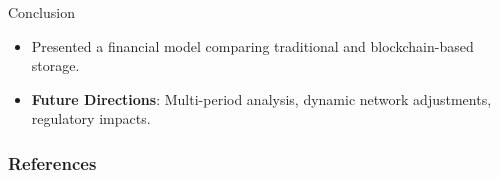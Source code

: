 \documentclass[aspectratio=169]{beamer}
\begin{document}
    \begin{frame}{Conclusion}
        \begin{itemize}
            \item Presented a financial model comparing traditional and blockchain-based storage.
            
            \item \textbf{Future Directions}: Multi-period analysis, dynamic network adjustments, regulatory impacts.
        \end{itemize}
    \end{frame}
    
	\begin{frame}[allowframebreaks]
		\frametitle{References}
		\printbibliography
	\end{frame}
\end{document}
